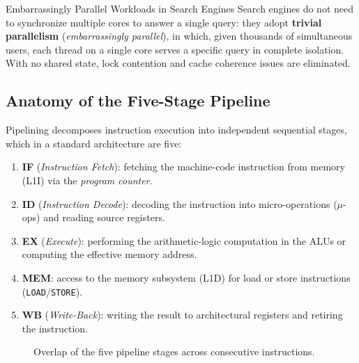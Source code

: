 \begin{noteblock}{Embarrassingly Parallel Workloads in Search Engines}
Search engines do not need to synchronize multiple cores to answer a single query: they adopt \textbf{trivial parallelism} (\textit{embarrassingly parallel}), in which, given thousands of simultaneous users, each thread on a single core serves a specific query in complete isolation. With no shared state, lock contention and cache coherence issues are eliminated.
\end{noteblock}

\subsection{Anatomy of the Five-Stage Pipeline}

Pipelining decomposes instruction execution into independent sequential stages, which in a standard architecture are five:

\begin{enumerate}
    \item \textbf{IF} (\textit{Instruction Fetch}): fetching the machine-code instruction from memory (L1I) via the \textit{program counter}.
    \item \textbf{ID} (\textit{Instruction Decode}): decoding the instruction into micro-operations ($\mu$-ops) and reading source registers.
    \item \textbf{EX} (\textit{Execute}): performing the arithmetic-logic computation in the ALUs or computing the effective memory address.
    \item \textbf{MEM}: access to the memory subsystem (L1D) for load or store instructions (\texttt{LOAD}/\texttt{STORE}).
    \item \textbf{WB} (\textit{Write-Back}): writing the result to architectural registers and retiring the instruction.
\end{enumerate}

\begin{figure}[H]
\centering
{}
\caption{Overlap of the five pipeline stages across consecutive instructions.}
\label{fig:pipeline-5-stadi-en}
\end{figure}

